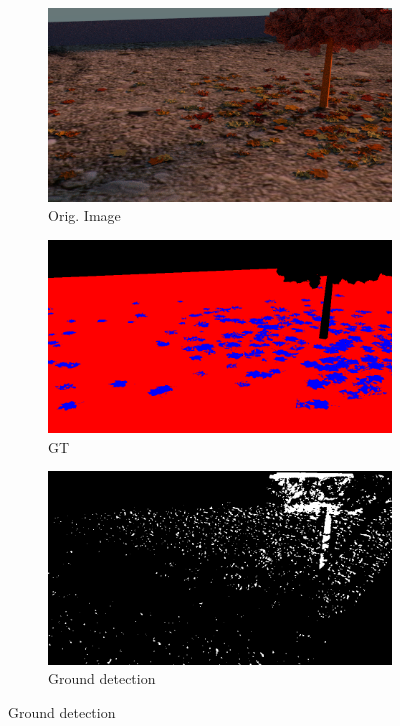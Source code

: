 \documentclass[fleqn,10pt]{SelfArx} %
\begin{document}
\begin{figure}
        \begin{subfigure}[b]{0.3\textwidth}
                \includegraphics[width=\linewidth]{Figures/Combi/im1(2)0001.png}
                \caption{Orig. Image}
                \label{fig:ResOrigImg}
        \end{subfigure}%
        \begin{subfigure}[b]{0.3\textwidth}
                \includegraphics[width=\linewidth]{Figures/Combi/im1(2)_anno0001.png}
                \caption{GT}
                \label{fig:ResGT}
        \end{subfigure}%
        \begin{subfigure}[b]{0.3\textwidth}
                \includegraphics[width=\linewidth]{Figures/Combi/im1(2)_step3_otsus_threshold.png}
                \caption{Ground detection}
                \label{fig:ResGD}
        \end{subfigure}%
        

\end{figure}
\end{document}

